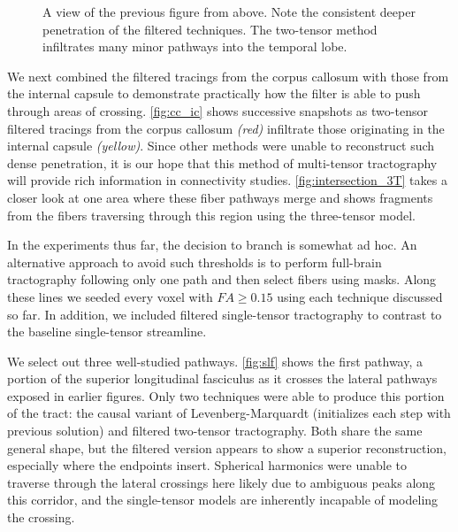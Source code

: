 \documentclass[final,hyperref]{gatech-thesis}
\begin{document}
\begin{figure}[t]
  \centering


  \caption{A view of the previous figure from above.  Note the consistent
    deeper penetration of the filtered techniques.  The two-tensor method
    infiltrates many minor pathways into the temporal lobe.}
  \label{fig:ioff_top}
\end{figure}



We next combined the filtered tracings from the corpus callosum with those
from the internal capsule to demonstrate practically how the filter is able to
push through areas of crossing.  \autoref{fig:cc_ic} shows successive
snapshots as two-tensor filtered tracings from the corpus callosum
\textit{(red)} infiltrate those originating in the internal capsule
\textit{(yellow)}.  Since other methods were unable to reconstruct such dense
penetration, it is our hope that this method of multi-tensor tractography will
provide rich information in connectivity studies.
%
\autoref{fig:intersection_3T} takes a closer look at one area where these
fiber pathways merge and shows fragments from the fibers traversing through
this region using the three-tensor model.

In the experiments thus far, the decision to branch is somewhat ad hoc.  An
alternative approach to avoid such thresholds is to perform full-brain
tractography following only one path and then select fibers using masks.
Along these lines we seeded every voxel with $FA\ge0.15$ using each technique
discussed so far.  In addition, we included filtered single-tensor
tractography to contrast to the baseline single-tensor streamline.

We select out three well-studied pathways.
%
\autoref{fig:slf} shows the first pathway, a portion of the superior
longitudinal fasciculus as it crosses the lateral pathways exposed in earlier
figures.  Only two techniques were able to produce this portion of the tract:
the causal variant of Levenberg-Marquardt (initializes each step with previous
solution) and filtered two-tensor tractography.  Both share the same general
shape, but the filtered version appears to show a superior reconstruction,
especially where the endpoints insert.  Spherical harmonics were unable to
traverse through the lateral crossings here likely due to ambiguous peaks
along this corridor, and the single-tensor models are inherently incapable of
modeling the crossing.
\end{document}
